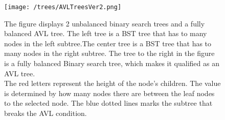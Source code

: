 \begin{figure}[H]
	\centering
	\texttt{[image: /trees/AVLTreesVer2.png]}	
	\caption{The figure displays 2 unbalanced binary search trees and a fully balanced AVL tree. The left tree is a BST tree that has to many nodes in the left subtree.The center tree is a BST tree that has to many nodes in the right subtree. The tree to the right in the figure is a fully balanced Binary search tree, which makes it qualified as an AVL tree. \\The red letters represent the height of the node's children. The value is determined by how many nodes there are between the leaf nodes to the selected node. The blue dotted lines marks the subtree that breaks the AVL condition.}
	\label{fig:AVLTrees}
\end{figure}
